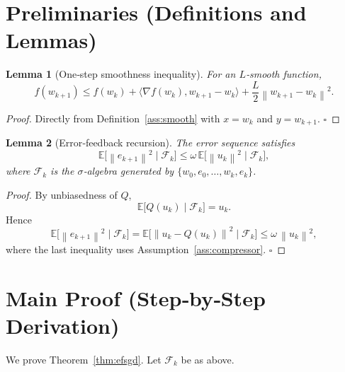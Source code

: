 \documentclass{article}
\newtheorem{lemma}{Lemma}
\newcommand{\EE}{\mathbb{E}}
\newcommand{\norm}[1]{\left\lVert#1\right\rVert}
\newcommand{\inner}[2]{\langle #1,#2\rangle}
\begin{document}
\section*{Preliminaries (Definitions and Lemmas)}
\begin{lemma}[One‑step smoothness inequality]\label{lem:smooth}
For an $L$‑smooth function,
\[
f(w_{k+1})\le f(w_{k})+\inner{\nabla f(w_{k})}{w_{k+1}-w_{k}}+\frac{L}{2}\norm{w_{k+1}-w_{k}}^{2}.
\]
\end{lemma}
\begin{proof}
Directly from Definition~\ref{ass:smooth} with $x=w_{k}$ and $y=w_{k+1}$. \hfill $\square$
\end{proof}
\begin{lemma}[Error‑feedback recursion]\label{lem:error}
The error sequence satisfies
\[
\EE\big[\norm{e_{k+1}}^{2}\mid\mathcal{F}_{k}\big]\le \omega\,\EE\big[\norm{u_{k}}^{2}\mid\mathcal{F}_{k}\big],
\]
where $\mathcal{F}_{k}$ is the $\sigma$‑algebra generated by $\{w_{0},e_{0},\dots,w_{k},e_{k}\}$.
\end{lemma}
\begin{proof}
By unbiasedness of $Q$,
\[
\EE\big[Q(u_{k})\mid\mathcal{F}_{k}\big]=u_{k}.
\]
Hence
\[
\EE\big[\norm{e_{k+1}}^{2}\mid\mathcal{F}_{k}\big]
 =\EE\big[\norm{u_{k}-Q(u_{k})}^{2}\mid\mathcal{F}_{k}\big]
 \le \omega\,\norm{u_{k}}^{2},
\]
where the last inequality uses Assumption~\ref{ass:compressor}. \hfill $\square$
\end{proof}

\section*{Main Proof (Step‑by‑Step Derivation)}
We prove Theorem~\ref{thm:efsgd}. Let $\mathcal{F}_{k}$ be as above.
\end{document}
